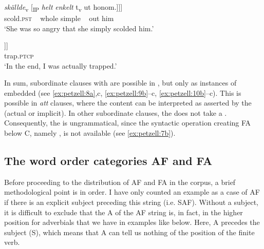 \documentclass[output=paper,colorlinks,citecolor=brown,draft,draftmode]{langscibook}
\begin{document}
\gll     \textit{{skällde}}\textsubscript{v} [\textsubscript{IP} \textit{{helt}} \textit{{enkelt}} t\textsubscript{v}  ut    honom.]]]  \\
    scold.\textsc{pst} ~ whole simple ~  out  him\\
\glt `She was so angry that she simply scolded him.’  \\


\gll     [\textsubscript{CP}    att [\textsubscript{CP}  jag  \textit{{blev}}\textsubscript{v} [\textsubscript{IP}      \textit{{faktiskt}}  t\textsubscript{v}     \\
          ~ that   ~ I    become.\textsc{pst}   ~ actually ~ \\
\gll     instängd.]]]  \\
    trap.\textsc{ptcp}\\
\glt `In the end, I was actually trapped.’
\z
\z


In sum, subordinate clauses with  are possible in , but only as instances of embedded  (see \ref{ex:petzell:8a},c, \ref{ex:petzell:9b}–c, \ref{ex:petzell:10b}–c). This is possible in \textit{att} clauses, where the content can be interpreted as asserted by the  (actual or implicit). In other subordinate clauses, the  does not take a  . Consequently, the  is ungrammatical, since the syntactic operation creating FA below C, namely  , is not available (see \ref{ex:petzell:7b}).


\subsection{The word order categories AF and FA}\label{sec:petzell:2.3}


Before proceeding to the distribution of AF and FA in the corpus, a brief methodological point is in order. I have only counted an example as a case of AF if there is an explicit subject preceding this string (i.e. SAF). Without a subject, it is difficult to exclude that the A of the AF string is, in fact, in the higher position for adverbials that we have in examples like  below. Here, A precedes the subject (S), which means that A can tell us nothing of the position of the finite verb.
\end{document}
